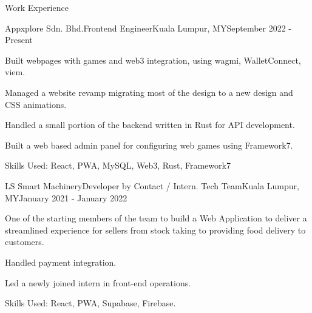 \documentclass{article}
\newlength{\tabin}
\newlength{\secsep}
\newcommand{\lineunder}{\vspace*{-8pt} \\ \hspace*{-6pt} \hrulefill \\ \vspace*{-15pt}}
\newenvironment{tabbedsection}[1]{
  \begin{list}{}{
      \setlength{\itemsep}{0pt}
      \setlength{\labelsep}{0pt}
      \setlength{\labelwidth}{0pt}
      \setlength{\leftmargin}{\tabin}
      \setlength{\rightmargin}{\tabin}
      \setlength{\listparindent}{0pt}
      \setlength{\parsep}{0pt}
      \setlength{\parskip}{0pt}
      \setlength{\partopsep}{0pt}
      \setlength{\topsep}{#1}
    }
  \item[]
}{\end{list}}
\newenvironment{resume_section}[1]{
  \filbreak
  \vspace{2\secsep}
  \textsc{\large#1}
  \lineunder
  \begin{tabbedsection}{\secsep}
}{\end{tabbedsection}}
\newenvironment{subitems}{
  \renewcommand{\labelitemi}{-}
  \begin{itemize}
      \setlength{\labelsep}{1em}
}{\end{itemize}}
\newenvironment{resume_employer}[4]{
  \vspace{\secsep}
  \textbf{#1} \\ 
  \indent {\small #2} \hfill {\footnotesize#3 (#4)}
  \begin{tabbedsection}{0pt}
  \begin{subitems}
}{\end{subitems}\end{tabbedsection}}
\begin{document}
\begin{resume_section}{Work Experience}
  \begin{resume_employer}{Appxplore Sdn. Bhd.}{Frontend Engineer}{Kuala Lumpur, MY}{September 2022 - Present}
    \item Built webpages with games and web3 integration, using wagmi, WalletConnect, viem.
    \item Managed a website revamp migrating most of the design to a new design and CSS animations.
    \item Handled a small portion of the backend written in Rust for API development.
    \item Built a web based admin panel for configuring web games using Framework7.
    \item Skills Used: React, PWA, MySQL, Web3, Rust, Framework7
  \end{resume_employer}

  \vspace{\baselineskip}

  \begin{resume_employer}{LS Smart Machinery}{Developer by Contact / Intern. Tech Team}{Kuala Lumpur, MY}{January 2021 - January 2022}
    \item One of the starting members of the team to build a Web Application to deliver a streamlined experience for sellers from stock taking to providing food delivery to customers.
    \item Handled payment integration.
    \item Led a newly joined intern in front-end operations.
    \item Skills Used: React, PWA, Supabase, Firebase.
  \end{resume_employer}
\end{resume_section}
\end{document}
